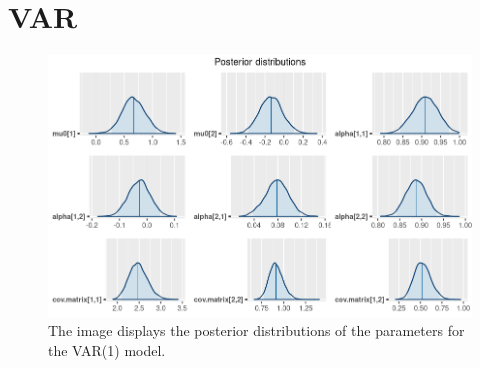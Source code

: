 \chapter{VAR}
\label{VAR}

\begin{figure}[h]
    \centering
    \includegraphics[width=\textwidth]{../Images/6-VAR/posteriors.png}
    \caption{The image displays the posterior distributions of the parameters for the VAR(1) model.}
    \label{fig:VAR_posteriors}
\end{figure}

